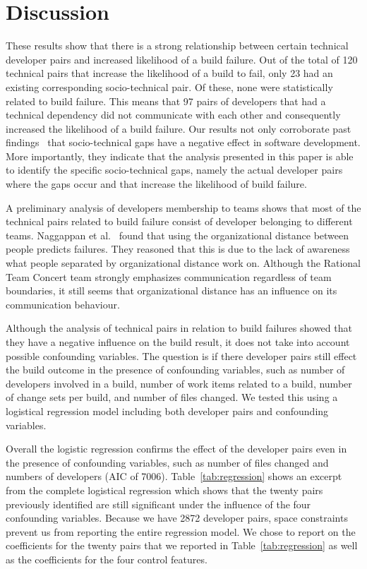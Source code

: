 \section{Discussion}
These results show that there is a strong relationship between certain technical
developer pairs and increased likelihood of a build failure.
Out of the total of 120 technical pairs that increase the likelihood of a
build to fail, only 23 had an existing
corresponding socio-technical pair. Of these, none were statistically
related to build failure. This means that 97 pairs of developers that had a
technical dependency did not communicate with each other and
consequently increased the likelihood of a build failure. Our results not only
corroborate past findings~\cite{cataldo:cscw:2006,cataldo:esem:2008} that socio-technical gaps
have a negative effect in software development. More importantly, they indicate
that the analysis presented in this paper is able to identify the specific
socio-technical gaps, namely the actual developer pairs where the gaps occur
and that increase the likelihood of build failure. 

A preliminary analysis of developers membership to teams shows that most
of the technical pairs related to build failure consist of developer belonging to
different teams. Naggappan et al.~\cite{nagappan:icse:2008} found that using the
organizational distance between people predicts failures. They reasoned that this
is due to the lack of awareness what people separated by organizational distance
work on. Although the Rational Team Concert team strongly emphasizes communication
regardless of team boundaries, it still seems that organizational distance has
an influence on its communication behaviour.


Although the analysis of technical pairs in relation to build failures
showed that they have a negative influence on the build result, it does not take
into account possible confounding variables. The question is if there developer pairs still effect the build outcome in the presence of confounding variables, such as number of developers involved in a build, number of work items
related to a build, number of change sets per build, and number of files changed.
We tested this using a logistical regression model including both developer pairs and confounding variables.

Overall the logistic regression confirms the effect of the developer pairs
even in the presence of confounding variables, such as number of files changed
and numbers of developers (AIC of 7006). 
Table~\ref{tab:regression} shows an excerpt from the complete logistical
regression which shows that the twenty pairs previously identified are still
significant under the influence of the four confounding variables. Because we have 2872 developer pairs, space constraints prevent us from reporting the entire regression model. We chose to report on the coefficients for the twenty pairs that we reported in Table~\ref{tab:regression} as well as the coefficients for the four control features.

